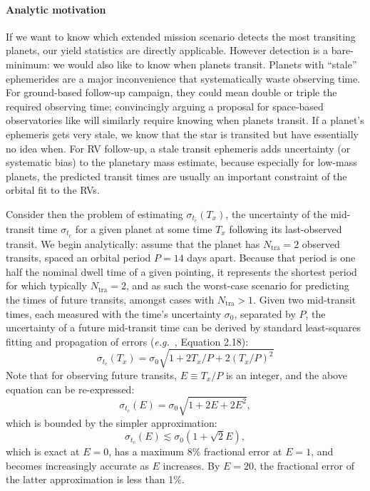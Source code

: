 \paragraph{Analytic motivation}
If we want to know which extended mission scenario detects the most transiting planets, our yield statistics are directly applicable.
However detection is a bare-minimum: we would also like to know when \tess planets transit.
Planets with ``stale'' ephemerides are a major inconvenience that systematically waste observing time.
For \tesss ground-based follow-up campaign, they could mean double or triple the required observing time; convincingly arguing a proposal for space-based observatories like \jwst will similarly require knowing when planets transit.
If a planet's ephemeris gets very stale, we know that the star is transited but have essentially no idea when. 
For RV follow-up, a stale transit ephemeris adds uncertainty (or systematic bias) to the planetary mass estimate, because especially for low-mass planets, the predicted transit times are usually an important constraint of the orbital fit to the RVs.

Consider then the problem of estimating $\sigma_{t_c}(T_x)$, the uncertainty of the mid-transit time $\sigma_{t_c}$ for a given planet at some time $T_x$ following its last-observed transit. 
We begin analytically: assume that the planet has $N_\mathrm{tra}=2$ observed transits, spaced an orbital period $P=14$ days apart. Because that period is one half the nominal \tess dwell time of a given pointing, it represents the shortest period for which typically $N_\mathrm{tra}=2$, and as such the worst-case scenario for predicting the times of future transits, amongst cases with $N_\mathrm{tra}>1$.
Given two mid-transit times, each measured with the time's uncertainty $\sigma_0$, separated by $P$, the uncertainty of a future mid-transit time can be derived by standard least-squares fitting and propagation of errors (\textit{e.g.}~\citet{lyons_practical_1991}, Equation 2.18):
\begin{equation}
	\sigma_{t_c}(T_x) = \sigma_0 \sqrt{1 + 2 T_x / P + 2 (T_x / P)^2 }
\end{equation}
Note that for observing future transits, $E \equiv T_x / P$ is an integer, and the above equation can be re-expressed:
\begin{equation}
	\sigma_{t_c}(E) = \sigma_0 \sqrt{1 + 2 E + 2 E^2 },
\end{equation}
which is bounded by the simpler approximation: 
\begin{equation}
	\sigma_{t_c}(E) \lesssim \sigma_0 \left(1+\sqrt{2} E\right), 
\end{equation}
which is exact at $E=0$, has a maximum 8\% fractional error at $E=1$, and becomes increasingly accurate as $E$ increases. By $E=20$, the fractional error of the latter approximation is less than 1\%.


